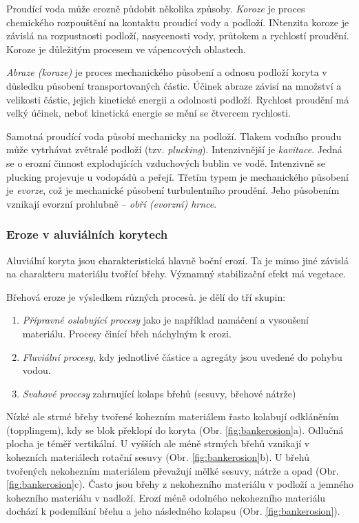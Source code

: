 Proudící voda může erozně půdobit několika způsoby. \emph{Koroze} je proces chemického rozpouštění na kontaktu proudící vody a podloží. INtenzita koroze je závislá na rozpustnosti podloží, nasycenosti vody, průtokem a rychlostí proudění. Koroze je důležitým procesem ve vápencových oblastech.

\emph{Abraze (koraze)} je proces mechanického působení a odnosu podloží koryta v důsledku působení transportovaných částic. Účinek abraze závisí na množství a velikosti částic, jejich kinetické energii a odolnosti podloží. Rychlost proudění má velký účinek, neboť kinetická energie se mění se čtvercem rychlosti. 

Samotná proudící voda působí mechanicky na podloží. Tlakem vodního proudu může vytrhávat zvětralé podloží (tzv. \emph{plucking}). Intenzivnější je \emph{kavitace}. Jedná se o erozní činnost explodujících vzduchových bublin ve vodě. Intenzivně se plucking projevuje u vodopádů a peřejí. Třetím typem je mechanického působení je \emph{evorze}, což je mechanické působení turbulentního proudění. Jeho působením vznikají evorzní prohlubně -- \emph{obří (evorzní) hrnce}.

\subsubsection{Eroze v aluviálních korytech}
Aluviální koryta jsou charakteristická hlavně boční erozí. Ta je mimo jiné závislá na charakteru materiálu tvořící břehy. Významný stabilizační efekt má vegetace.

Břehová eroze je výsledkem různých procesů. \textcite{charltonFundamentalsFluvialGeomorphology2007} je dělí do tří skupin:
\begin{enumerate}
	\item \emph{Přípravné oslabující procesy} jako je například namáčení a vysoušení materiálu. Procesy činící břeh náchylným k erozi.
	\item \emph{Fluviální procesy}, kdy jednotlivé částice a agregáty jsou uvedené do pohybu vodou.
	\item \emph{Svahové procesy} zahrnující kolaps břehů (sesuvy, břehové nátrže)
\end{enumerate}

Nízké ale strmé břehy tvořené kohezním materiálem řasto kolabují odkláněním (topplingem), kdy se blok překlopí do koryta (Obr. \ref{fig:bankerosion}a). Odlučná plocha je téměř vertikální. U vyšších ale méně strmých břehů vznikají v kohezních materiálech rotační sesuvy (Obr. \ref{fig:bankerosion}b). U břehů tvořených nekohezním materiálem převažují mělké sesuvy, nátrže a opad (Obr. \ref{fig:bankerosion}c). Často jsou břehy z nekohezního materiálu v podloží a jemného kohezního materiálu v nadloží. Erozí méně odolného nekohezního materiálu dochází k podemílání břehu a jeho následného kolapsu (Obr. \ref{fig:bankerosion}).

